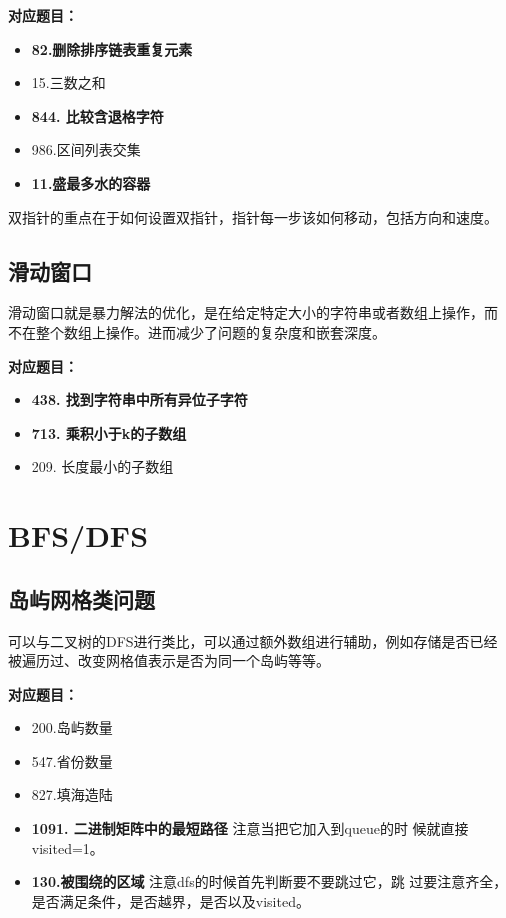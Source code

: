\documentclass[a4paper,twoside]{ctexart}
\begin{document}
\textbf{对应题目：}
\begin{itemize}
\item \textbf{82.删除排序链表重复元素}
\item 15.三数之和
\item \textbf{844. 比较含退格字符}
\item 986.区间列表交集
\item \textbf{11.盛最多水的容器}
\end{itemize}

双指针的重点在于如何设置双指针，指针每一步该如何移动，包括方向和速度。

\subsection{滑动窗口}

滑动窗口就是暴力解法的优化，是在给定特定大小的字符串或者数组上操作，而
不在整个数组上操作。进而减少了问题的复杂度和嵌套深度。

\textbf{对应题目：}
\begin{itemize}
\item \textbf{438. 找到字符串中所有异位子字符}
\item \textbf{713. 乘积小于k的子数组}
\item 209. 长度最小的子数组
\end{itemize}

\section{BFS/DFS}

\subsection{岛屿网格类问题}

可以与二叉树的DFS进行类比，可以通过额外数组进行辅助，例如存储是否已经
被遍历过、改变网格值表示是否为同一个岛屿等等。

\textbf{对应题目：}
\begin{itemize}
\item 200.岛屿数量
\item 547.省份数量
\item 827.填海造陆
\item \textbf{1091. 二进制矩阵中的最短路径} 注意当把它加入到queue的时
  候就直接visited=1。
\item \textbf{130.被围绕的区域}  注意dfs的时候首先判断要不要跳过它，跳
  过要注意齐全，是否满足条件，是否越界，是否以及visited。
\end{itemize}
\end{document}
